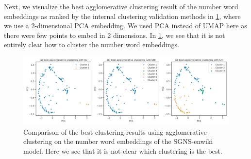 Next, we visualize the best agglomerative clustering result of the number word embeddings as ranked by the internal clustering validation methods in \cref{fig:cluster-analysis-agglomerative-numbers-word-group-internal-cluster-validation-best-2d-pca}, where we use a 2-dimensional PCA embedding. We used PCA instead of UMAP here as there were few points to embed in 2 dimensions. In \cref{fig:cluster-analysis-agglomerative-numbers-word-group-internal-cluster-validation-best-2d-pca}, we see that it is not entirely clear how to cluster the number word embeddings.
\begin{figure}[H]
    \centering
    \includegraphics[width=\textwidth]{thesis/figures/cluster-analysis-agglomerative-numbers-word-group-internal-cluster-validation-best-2d-pca.pdf}
    \caption{Comparison of the best clustering results using agglomerative clustering on the number word embeddings of the SGNS-enwiki model. Here we see that it is not clear which clustering is the best.}
    \label{fig:cluster-analysis-agglomerative-numbers-word-group-internal-cluster-validation-best-2d-pca}
\end{figure}

